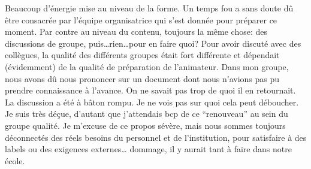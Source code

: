 \documentclass[
  french,
]{article}
\begin{document}
\begin{itemize}
  Beaucoup d'énergie mise au niveau de la forme. Un temps fou a sans doute dû être consacrée par l'équipe organisatrice qui s'est donnée pour préparer ce moment. Par contre au niveau du contenu, toujours la même chose: des discussions de groupe, puis\ldots rien\ldots pour en faire quoi? Pour avoir discuté avec des collègues, la qualité des différents groupes était fort différente et dépendait (évidemment) de la qualité de préparation de l'animateur. Dans mon groupe, nous avons dû nous prononcer sur un document dont nous n'avions pas pu prendre connaissance à l'avance. On ne savait pas trop de quoi il en retournait. La discussion a été à bâton rompu. Je ne vois pas sur quoi cela peut déboucher. Je suis très déçue, d'autant que j'attendais bcp de ce ``renouveau'' au sein du groupe qualité. Je m'excuse de ce propos sévère, mais nous sommes toujours déconnectés des réels besoins du personnel et de l'institution, pour satisfaire à des labels ou des exigences externes\ldots{} dommage, il y aurait tant à faire dans notre école.
\end{itemize}
\end{document}
